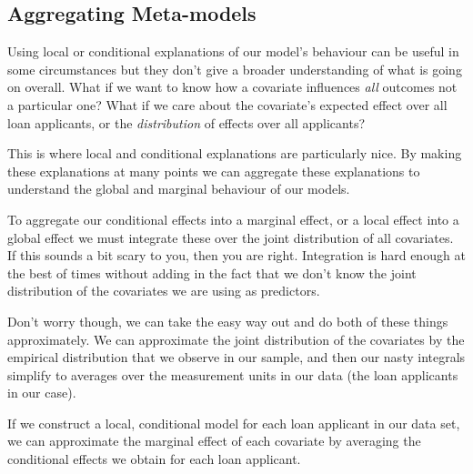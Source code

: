 \documentclass[
  12pt,
]{book}
\begin{document}
\hypertarget{aggregating-meta-models}{%
\subsection{Aggregating Meta-models}\label{aggregating-meta-models}}

Using local or conditional explanations of our model's behaviour can be useful in some circumstances but they don't give a broader understanding of what is going on overall. What if we want to know how a covariate influences \emph{all} outcomes not a particular one? What if we care about the covariate's expected effect over all loan applicants, or the \emph{distribution} of effects over all applicants?

This is where local and conditional explanations are particularly nice. By making these explanations at many points we can aggregate these explanations to understand the global and marginal behaviour of our models.

To aggregate our conditional effects into a marginal effect, or a local effect into a global effect we must integrate these over the joint distribution of all covariates. If this sounds a bit scary to you, then you are right. Integration is hard enough at the best of times without adding in the fact that we don't know the joint distribution of the covariates we are using as predictors.

Don't worry though, we can take the easy way out and do both of these things approximately. We can approximate the joint distribution of the covariates by the empirical distribution that we observe in our sample, and then our nasty integrals simplify to averages over the measurement units in our data (the loan applicants in our case).

If we construct a local, conditional model for each loan applicant in our data set, we can approximate the marginal effect of each covariate by averaging the conditional effects we obtain for each loan applicant.
\end{document}
